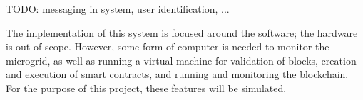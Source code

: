 TODO: messaging in system, user identification, ... 

The implementation of this system is focused around the software; the hardware is out of scope. However, some form of computer is needed to monitor the microgrid, as well as running a virtual machine for validation of blocks, creation and execution of smart contracts, and running and monitoring the blockchain. For the purpose of this project, these features will be simulated.







